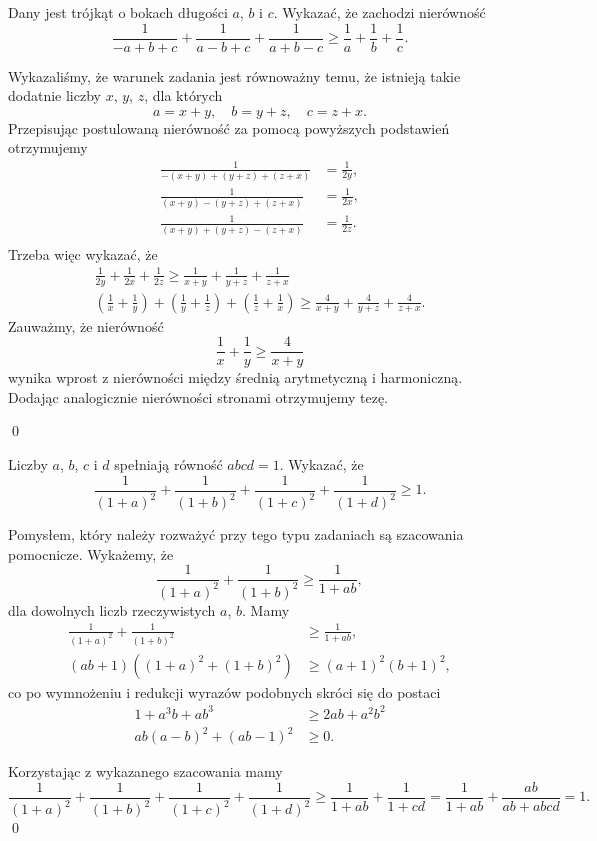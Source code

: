 

\noindent
Dany jest trójkąt o bokach długości $a$, $b$ i $c$. Wykazać, że zachodzi nierówność
\[
	\frac{1}{-a + b + c} + \frac{1}{a - b + c} + \frac{1}{a + b - c} \geqslant \frac{1}{a} + \frac{1}{b} + \frac{1}{c}.
\]


\noindent
Wykazaliśmy, że warunek zadania jest równoważny temu, że istnieją takie dodatnie liczby $x$, $y$, $z$, dla których
\[
	a = x + y, \quad b = y + z, \quad c = z + x.
\]
Przepisując postulowaną nierówność za pomocą powyższych podstawień otrzymujemy
\begin{align*}
	\frac{1}{-(x + y) + (y + z) + (z + x)} &= \frac{1}{2y}, \\
	\frac{1}{(x + y) - (y + z) + (z + x)} &= \frac{1}{2x}, \\
	\frac{1}{(x + y) + (y + z) - (z + x)} &= \frac{1}{2z}. \\
\end{align*}
Trzeba więc wykazać, że
\begin{align*}
	\frac{1}{2y} + \frac{1}{2x} + \frac{1}{2z} \geqslant \frac{1}{x + y} + \frac{1}{y + z} + \frac{1}{z + x} \\
	\left(\frac{1}{x} + \frac{1}{y}\right) + \left(\frac{1}{y} + \frac{1}{z}\right) + \left(\frac{1}{z} + \frac{1}{x}\right) \geqslant \frac{4}{x + y} + \frac{4}{y + z} + \frac{4}{z + x}.
\end{align*}
Zauważmy, że nierówność
\[
	\frac{1}{x} + \frac{1}{y} \geqslant \frac{4}{x + y}
\]
wynika wprost z nierówności między średnią arytmetyczną i harmoniczną. Dodając analogicznie nierówności stronami otrzymujemy tezę.

\qed


\noindent
Liczby $a$, $b$, $c$ i $d$ spełniają równość $abcd = 1$. Wykazać, że
\[
	\frac{1}{(1 + a)^2} + \frac{1}{(1 + b)^2} + \frac{1}{(1 + c)^2} + \frac{1}{(1 + d)^2} \geqslant 1.
\]


\noindent
Pomysłem, który należy rozważyć przy tego typu zadaniach są szacowania pomocnicze. Wykażemy, że
\[
	\frac{1}{(1 + a)^2} + \frac{1}{(1 + b)^2} \geqslant \frac{1}{1 + ab},
\]
dla dowolnych liczb rzeczywistych $a$, $b$. Mamy
\begin{align*}
	\frac{1}{(1 + a)^2} + \frac{1}{(1 + b)^2} &\geqslant \frac{1}{1 + ab}, \\
	(ab + 1)\left( (1 + a)^2 + (1 + b)^2\right) &\geqslant (a + 1)^2(b + 1)^2, 
\end{align*}
co po wymnożeniu i redukcji wyrazów podobnych skróci się do postaci
\begin{align*}
	1 + a^3b + ab^3 &\geqslant 2ab + a^2b^2 \\
	ab(a - b)^2 + (ab - 1)^2 &\geqslant 0.
\end{align*}

\noindent
Korzystając z wykazanego szacowania mamy
\[
	\frac{1}{(1 + a)^2} + \frac{1}{(1 + b)^2} + \frac{1}{(1 + c)^2} + \frac{1}{(1 + d)^2} \geqslant \frac{1}{1 + ab} + \frac{1}{1 + cd} = \frac1{1 + ab} + \frac{ab}{ab + abcd} = 1.
\]
\qed

